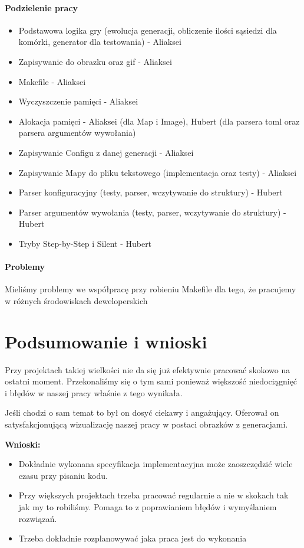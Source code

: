 \documentclass[12pt]{article}
\begin{document}
\paragraph{Podzielenie pracy}
\begin{itemize}
    \item 
    Podstawowa logika gry (ewolucja generacji, obliczenie ilości sąsiedzi dla komórki, generator dla testowania)  - Aliaksei
    \item 
    Zapisywanie do obrazku oraz gif - Aliaksei
    \item
    Makefile - Aliaksei
    \item
    Wyczyszczenie pamięci - Aliaksei
    \item 
    Alokacja pamięci - Aliaksei (dla Map i Image), Hubert (dla parsera toml oraz parsera argumentów wywołania)
    \item
    Zapisywanie Configu z danej generacji - Aliaksei
    \item
    Zapisywanie Mapy do pliku tekstowego (implementacja oraz testy) - Aliaksei
    \item 
    Parser konfiguracyjny (testy, parser, wczytywanie do struktury) - Hubert
    \item 
    Parser argumentów wywołania (testy, parser, wczytywanie do struktury) - Hubert
    \item 
    Tryby Step-by-Step i Silent - Hubert
    
\end{itemize}

\paragraph{Problemy}
Mieliśmy problemy we współpracę przy robieniu Makefile dla tego, że pracujemy w różnych środowiskach deweloperskich

\section{Podsumowanie i wnioski}

Przy projektach takiej wielkości nie da się już efektywnie pracować skokowo na ostatni moment.
Przekonaliśmy się o tym sami ponieważ większość niedociągnięć i błędów w naszej pracy właśnie z tego wynikała.

Jeśli chodzi o sam temat to był on dosyć ciekawy i angażujący.
Oferował on satysfakcjonującą wizualizację naszej pracy w postaci obrazków z generacjami.

 
\textbf{Wnioski:}
 
 \begin{itemize}
 \item
 Dokładnie wykonana specyfikacja implementacyjna może zaoszczędzić wiele czasu przy pisaniu kodu.
 
 \item
 Przy większych projektach trzeba pracować regularnie a nie w skokach tak jak my to robiliśmy.
 Pomaga to z poprawianiem błędów i wymyślaniem rozwiązań.
 
 \item
 Trzeba dokładnie rozplanowywać jaka praca jest do wykonania
 \end{itemize}
\end{document}
